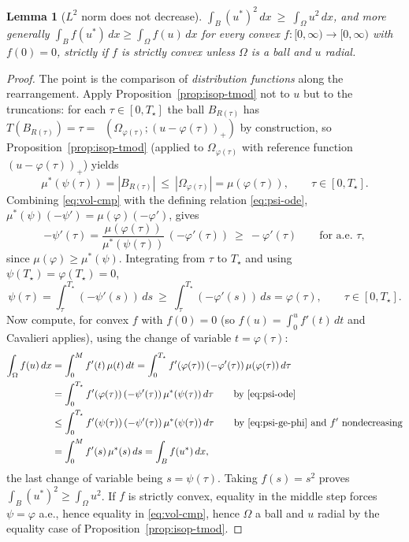 \documentclass[11pt]{amsart}
\newtheorem{lemma}[theorem]{Lemma}
\theoremstyle{definition}
\newcommand{\Om}{\Omega}
\newcommand{\abs}[1]{\left|#1\right|}
\newcommand{\dx}{\,dx}
\newcommand{\dt}{\,dt}
\DeclareMathOperator{\Tmod}{T_{\mathrm{mod}}}
\begin{document}
\begin{lemma}[$L^2$ norm does not decrease]\label{lem:B}
$\displaystyle\int_B(u^*)^2\dx\ \ge\ \int_\Om u^2\dx$, and more generally
$\int_B f(u^*)\dx\ge\int_\Om f(u)\dx$ for every convex
$f:[0,\infty)\to[0,\infty)$ with $f(0)=0$, strictly if $f$ is strictly
convex unless $\Om$ is a ball and $u$ radial.
\end{lemma}

\begin{proof}
The point is the comparison of \emph{distribution functions} along the
rearrangement. Apply Proposition~\ref{prop:isop-tmod} not to $u$ but to the
truncations: for each $\tau\in[0,T_\star]$ the ball $B_{R(\tau)}$ has
$T(B_{R(\tau)})=\tau=\Tmod(\Om_{\varphi(\tau)};(u-\varphi(\tau))_+)$ by
construction, so Proposition~\ref{prop:isop-tmod} (applied to
$\Om_{\varphi(\tau)}$ with reference function $(u-\varphi(\tau))_+$) yields
\begin{equation}\label{eq:vol-cmp}
  \mu^*(\psi(\tau))=\abs{B_{R(\tau)}}\ \le\ \abs{\Om_{\varphi(\tau)}}
  =\mu(\varphi(\tau)),\qquad\tau\in[0,T_\star].
\end{equation}
Combining \eqref{eq:vol-cmp} with the defining relation
\eqref{eq:psi-ode}, $\mu^*(\psi)(-\psi')=\mu(\varphi)(-\varphi')$, gives
\begin{equation}\label{eq:psi-monotone}
  -\psi'(\tau)=\frac{\mu(\varphi(\tau))}{\mu^*(\psi(\tau))}\,(-\varphi'(\tau))
  \ \ge\ -\varphi'(\tau)\qquad\text{for a.e.\ }\tau,
\end{equation}
since $\mu(\varphi)\ge\mu^*(\psi)$. Integrating from $\tau$ to $T_\star$ and
using $\psi(T_\star)=\varphi(T_\star)=0$,
\begin{equation}\label{eq:psi-ge-phi}
  \psi(\tau)=\int_\tau^{T_\star}(-\psi'(s))\,ds
  \ \ge\ \int_\tau^{T_\star}(-\varphi'(s))\,ds=\varphi(\tau),
  \qquad\tau\in[0,T_\star].
\end{equation}
Now compute, for convex $f$ with $f(0)=0$ (so $f(u)=\int_0^u f'(t)\dt$ and
Cavalieri applies), using the change of variable $t=\varphi(\tau)$:
\begin{align*}
  \int_\Om f(u)\dx
  &=\int_0^M f'(t)\,\mu(t)\dt
  =\int_0^{T_\star}f'(\varphi(\tau))\,(-\varphi'(\tau))\,\mu(\varphi(\tau))\,d\tau\\
  &=\int_0^{T_\star}f'(\varphi(\tau))\,(-\psi'(\tau))\,\mu^*(\psi(\tau))\,d\tau
  \qquad\text{by \eqref{eq:psi-ode}}\\
  &\le\int_0^{T_\star}f'(\psi(\tau))\,(-\psi'(\tau))\,\mu^*(\psi(\tau))\,d\tau
  \qquad\text{by \eqref{eq:psi-ge-phi} and $f'$ nondecreasing}\\
  &=\int_0^M f'(s)\,\mu^*(s)\,ds=\int_B f(u^*)\dx,
\end{align*}
the last change of variable being $s=\psi(\tau)$. Taking $f(s)=s^2$ proves
$\int_B(u^*)^2\ge\int_\Om u^2$. If $f$ is strictly convex, equality in the
middle step forces $\psi=\varphi$ a.e., hence equality in
\eqref{eq:vol-cmp}, hence $\Om$ a ball and $u$ radial by the equality case
of Proposition~\ref{prop:isop-tmod}.
\end{proof}
\end{document}
